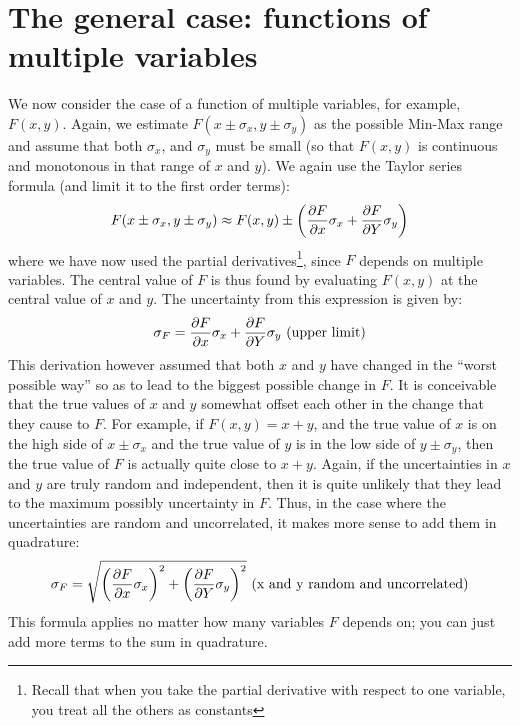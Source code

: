 \section{The general case: functions of multiple variables}

We now consider the case of a function of multiple variables, for example, $F(x,y)$. Again, we estimate $F(x\pm\sigma_{x}, y\pm\sigma_{y})$ as the possible Min-Max range and assume that both $\sigma_{x}$, and $\sigma_{y}$ must be small (so that $F(x,y)$ is continuous and monotonous in that range of $x$ and $y$). We again use the Taylor series formula (and limit it to the first order terms):
\begin{align}
F(x\pm\sigma_{x}, y\pm\sigma_{y})\approx F(x,y)\pm \left(\frac{\partial F}{\partial x}\sigma_{x} + \frac{\partial F}{\partial Y} \sigma_{y}\right)
\end{align}
where we have now used the partial derivatives\footnote{Recall that when you take the partial derivative with respect to one variable, you treat all the others as constants}, since $F$ depends on multiple variables. The central value of $F$ is thus found by evaluating $F(x,y)$ at the central value of $x$ and $y$. The uncertainty from this expression is given by:
\begin{align}
\sigma_{F} = \frac{\partial F}{\partial x}\sigma_{x} + \frac{\partial F}{\partial Y} \sigma_{y} \text{      (upper limit)}
\end{align}
This derivation however assumed that both $x$ and $y$ have changed in the ``worst possible way'' so as to lead to the biggest possible change in $F$. It is conceivable that the true values of $x$ and $y$ somewhat offset each other in the change that they cause to $F$. For example, if $F(x,y)=x+y$, and the true value of $x$ is on the high side of $x\pm \sigma_{x}$ and the true value of $y$ is in the low side of $y \pm \sigma_{y}$, then the true value of $F$ is actually quite close to $x+y$. Again, if the uncertainties in $x$ and $y$ are truly random and independent, then it is quite unlikely that they lead to the maximum possibly uncertainty in $F$. Thus, in the case where the uncertainties are random and uncorrelated, it makes more sense to add them in quadrature:
\begin{align}
\label{eqn:derivPropagate}
\sigma_{F} = \sqrt{\left(\frac{\partial F}{\partial x}\sigma_{x}\right)^2 + \left(\frac{\partial F}{\partial Y} \sigma_{y}\right)^2}\text{      (x and y random and uncorrelated)}
\end{align}
This formula applies no matter how many variables $F$ depends on; you can just add more terms to the sum in quadrature. 

